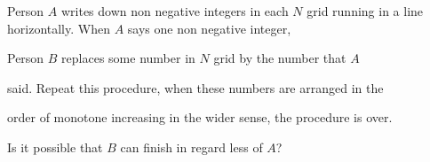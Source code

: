 Person $A$ writes down  non negative integers in each $N$ grid running in a line horizontally. When $A$ says one non negative integer,

Person $B$ replaces some number in $N$ grid by the number that $A$

 said. Repeat this procedure, when these numbers are arranged in the 

order of monotone increasing in the wider sense, the procedure is over. 

Is it possible that $B$ can finish in regard less of $A$?